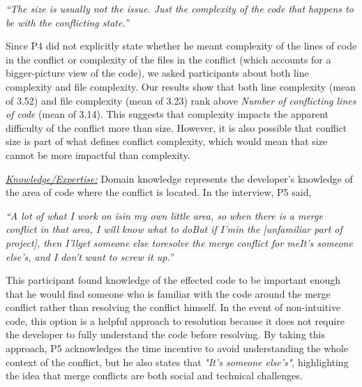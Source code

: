 \begin{displayquote}
\textit{``The size is usually not the issue. Just the complexity of the code that happens to be with the conflicting state.''}	
\end{displayquote}
Since P4 did not explicitly state whether he meant complexity of the lines of code in the conflict or complexity of the files in the conflict (which accounts for a bigger-picture view of the code), we asked participants about both line complexity and file complexity. Our results show that both line complexity (mean of 3.52) and file complexity (mean of 3.23) rank above \textit{Number of conflicting lines of code} (mean of 3.14). This suggests that complexity impacts the apparent difficulty of the conflict more than size. However, it is also possible that conflict size is part of what defines conflict complexity, which would mean that size cannot be more impactful than complexity. 

\underline{\textit{Knowledge/Expertise:}} Domain knowledge represents the developer's knowledge of the area of code where the conflict is located. In the interview, P5 said, 

\begin{displayquote}
	\textit{``A lot of what I work on is\textellipsis in my own little area, so when there is a merge conflict in that area, I will know what to do\textellipsis But if I'm\textellipsis in the [unfamiliar part of project], then I'll\textellipsis get someone else to\textellipsis resolve the merge conflict for me\textellipsis It's someone else's, and I don't want to screw it up.''}
\end{displayquote}

This participant found knowledge of the effected code to be important enough that he would find someone who is familiar with the code around the merge conflict rather than resolving the conflict himself. In the event of non-intuitive code, this option is a helpful approach to resolution because it does not require the developer to fully understand the code before resolving. By taking this approach, P5 acknowledges the time incentive to avoid understanding the whole context of the conflict, but he also states that \textit{"It's someone else's"}, highlighting the idea that merge conflicts are both social and technical challenges.

